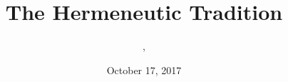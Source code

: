 \documentclass[xcolor=dvipsnames]{beamer}
\title{The Hermeneutic Tradition}
\subtitle{{\CourseNumber}, {\CourseInst}}
\author{\CourseName}
\date{October 17, 2017}
\begin{document}
\begin{frame}
  \titlepage
\end{frame}



\end{document}
